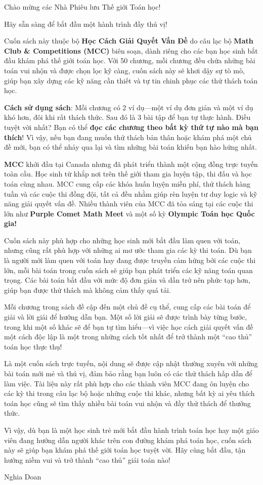 \documentclass[2024-2025]{subfiles}
\begin{document}
Chào mừng các Nhà Phiêu lưu Thế giới Toán học!  

\bigbreak

Hãy sẵn sàng để bắt đầu một hành trình đầy thú vị!

Cuốn sách này thuộc bộ \textbf{Học Cách Giải Quyết Vấn Đề} do câu lạc bộ \textbf{Math Club \& Competitions (MCC)} biên soạn, dành riêng cho các bạn học sinh bắt đầu khám phá thế giới toán học.
Với 50 chương, mỗi chương đều chứa những bài toán vui nhộn và được chọn lọc kỹ càng, cuốn sách này sẽ khơi dậy sự tò mò, giúp bạn xây dựng các kỹ năng cần thiết và tự tin chinh phục các thử thách toán học.

\textbf{Cách sử dụng sách}: Mỗi chương có 2 ví dụ—một ví dụ đơn giản và một ví dụ khó hơn, đôi khi rất thách thức. Sau đó là 3 bài tập để bạn tự thực hành.
Điều tuyệt vời nhất? Bạn có thể \textbf{đọc các chương theo bất kỳ thứ tự nào mà bạn thích}!
Vì vậy, nếu bạn đang muốn thử thách bản thân hoặc khám phá một chủ đề mới, bạn có thể nhảy qua lại và tìm những bài toán khiến bạn hào hứng nhất.

\textbf{MCC} khởi đầu tại Canada nhưng đã phát triển thành một cộng đồng trực tuyến toàn cầu. Học sinh từ khắp nơi trên thế giới tham gia luyện tập, thi đấu và học toán cùng nhau.
MCC cung cấp các khóa huấn luyện miễn phí, thử thách hàng tuần và các cuộc thi đồng đội, tất cả đều nhằm giúp rèn luyện tư duy logic và kỹ năng giải quyết vấn đề.
Nhiều thành viên của MCC đã tỏa sáng tại các cuộc thi lớn như \textbf{Purple Comet Math Meet} và một số kỳ \textbf{Olympic Toán học Quốc gia!}

Cuốn sách này phù hợp cho những học sinh mới bắt đầu làm quen với toán, nhưng cũng rất phù hợp với những ai mơ ước tham gia các kỳ thi toán.
Dù bạn là người mới làm quen với toán hay đang được truyền cảm hứng bởi các cuộc thi lớn, mỗi bài toán trong cuốn sách sẽ giúp bạn phát triển các kỹ năng toán quan trọng.
Các bài toán bắt đầu với mức độ đơn giản và dần trở nên phức tạp hơn, giúp bạn được thử thách mà không cảm thấy quá tải.

Mỗi chương trong sách đề cập đến một chủ đề cụ thể, cung cấp các bài toán để giải và lời giải để hướng dẫn bạn. Một số lời giải sẽ được trình bày từng bước,
trong khi một số khác sẽ để bạn tự tìm hiểu—vì việc học cách giải quyết vấn đề một cách độc lập là một trong những cách tốt nhất để trở thành một “cao thủ” toán học thực thụ!

Là một cuốn sách trực tuyến, nội dung sẽ được cập nhật thường xuyên với những bài toán mới mẻ và thú vị, đảm bảo rằng bạn luôn có các thử thách hấp dẫn để làm việc.
Tài liệu này rất phù hợp cho các thành viên MCC đang ôn luyện cho các kỳ thi trong câu lạc bộ hoặc những cuộc thi khác,
nhưng bất kỳ ai yêu thích toán học cũng sẽ tìm thấy nhiều bài toán vui nhộn và đầy thử thách để thưởng thức.

Vì vậy, dù bạn là một học sinh trẻ mới bắt đầu hành trình toán học hay một giáo viên đang hướng dẫn người khác trên con đường khám phá toán học,
cuốn sách này sẽ giúp bạn khám phá thế giới toán học tuyệt vời. Hãy cùng bắt đầu, tận hưởng niềm vui và trở thành “cao thủ” giải toán nào!

\flushright Nghia Doan
\end{document}
